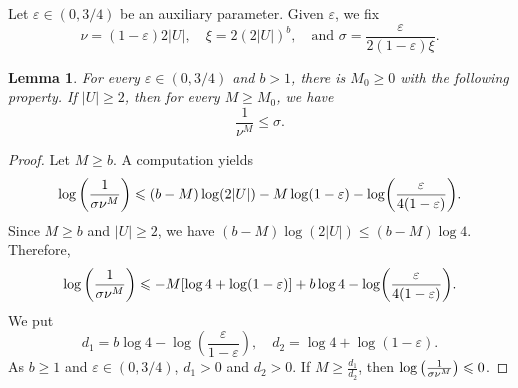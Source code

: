 \documentclass[leqno,a4paper,10pt]{amsart}
\theoremstyle{plain}
\newtheorem{lem}[thm]{Lemma}
\theoremstyle{definition}
\theoremstyle{remark}
\let\le\leqslant
\let\ge\geqslant
\begin{document}
Let $\varepsilon\in (0,3/4)$ be an auxiliary parameter. Given $\varepsilon$, we fix
$$\nu=(1-\varepsilon)2|U|,\quad \xi=2(2|U|)^b,\quad\text{and }  \sigma=\frac{\varepsilon}{2(1-\varepsilon)\xi}.$$

\begin{lem}
	\label{lem:computation}
	For every $\varepsilon\in (0,3/4)$ and $b>1$, there is $M_0\ge 0$ with the following property. 
	If $|U|\ge 2$, then for every $M\ge M_0$, we have 
	$$\frac{1}{\nu^{M}}\le \sigma.$$
\end{lem}

\begin{proof}
	Let $M\ge b$. A computation yields 
	$$\log\qty(\frac{1}{\sigma\nu^M})\le (b-M)\log(2|U|)-M\log(1-\varepsilon)-\log(\frac{\varepsilon}{4(1-\varepsilon)}).$$
	Since $M\ge b$ and $|U|\ge 2$, we have $(b-M)\log(2|U|)\le (b-M)\log 4.$
	Therefore,
	$$\log\qty(\frac{1}{\sigma\nu^M})\le -M[\log 4+\log(1-\varepsilon)]+b\log4-\log(\frac{\varepsilon}{4(1-\varepsilon)}).$$
	We put
	$$
	d_1=b\log4-\log(\frac{\varepsilon}{1-\varepsilon}),\quad		d_2=\log 4+\log(1-\varepsilon). 
	$$
	As $b\ge 1$ and $\varepsilon\in (0,3/4)$, $d_1>0$  and $d_2>0$. If $M\ge \frac{d_1}{d_2}$, then $\log\qty(\frac{1}{\sigma\nu^M})\le 0$. 
\end{proof}
\end{document}
